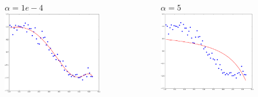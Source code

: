 \documentclass[handout, 10pt]{beamer}
\begin{document}
\begin{frame}
\begin{columns}
\vspace{-2em}
\begin{figure}
$\alpha=1e-4$
\includegraphics[width=0.99\textwidth]{./ridge_alpha1e-4.png}
\end{figure}
\vspace{-2em}
\begin{figure}
$\alpha=5$
\includegraphics[width=0.99\textwidth]{./ridge_alpha5.png}
\end{figure}
\end{columns}
\end{frame}
\end{document}
